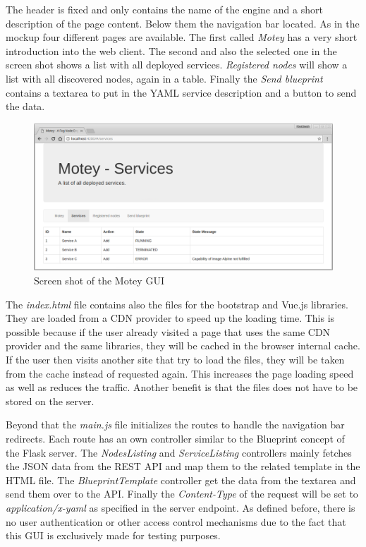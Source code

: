The header is fixed and only contains the name of the engine and a short description of the page content.
Below them the navigation bar located.
As in the mockup four different pages are available.
The first called \textit{Motey} has a very short introduction into the web client.
The second and also the selected one in the screen shot shows a list with all deployed services.
\textit{Registered nodes} will show a list with all discovered nodes, again in a table.
Finally the \textit{Send blueprint} contains a textarea to put in the \ac{YAML} service description and a button to send the data.\newline

\begin{figure}[H]
    \centering
    \includegraphics[width=\textwidth]{resources/images/motey_gui_screenshot.png}
    \caption[Screen shot of the Motey GUI]{Screen shot of the Motey \ac{GUI}}
    \label{fig:motey_gui_screenshot}
\end{figure}

The \textit{index.html} file contains also the files for the bootstrap and Vue.js libraries.
They are loaded from a \ac{CDN} provider to speed up the loading time.
This is possible because if the user already visited a page that uses the same \ac{CDN} provider and the same libraries, they will be cached in the browser internal cache.
If the user then visits another site that try to load the files, they will be taken from the cache instead of requested again.
This increases the page loading speed as well as reduces the traffic.
Another benefit is that the files does not have to be stored on the server.\newline

Beyond that the \textit{main.js} file initializes the routes to handle the navigation bar redirects.
Each route has an own controller similar to the Blueprint concept of the Flask server.
The \textit{NodesListing} and \textit{ServiceListing} controllers mainly fetches the \ac{JSON} data from the \ac{REST} \ac{API} and map them to the related template in the \ac{HTML} file.
The \textit{BlueprintTemplate} controller get the data from the textarea and send them over to the \ac{API}.
Finally the \textit{Content-Type} of the request will be set to \textit{application/x-yaml} as specified in the server endpoint.
As defined before, there is no user authentication or other access control mechanisms due to the fact that this \ac{GUI} is exclusively made for testing purposes.

